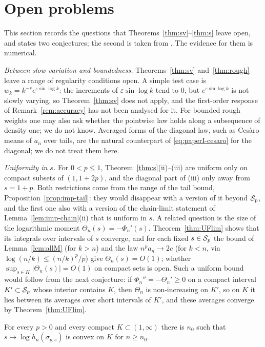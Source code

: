 \section{Open problems}\label{sec:open}

This section records the questions that Theorems~\ref{thm:sv}--\ref{thm:s} leave open, and states two conjectures;
the second is taken from \cite{PaperII}. The evidence for them is numerical.

\emph{Between slow variation and boundedness.} Theorems~\ref{thm:sv} and~\ref{thm:rough} leave a range of regularity
conditions open. A simple test case is $w_k=k^{-s}e^{\varepsilon\sin\log k}$: the increments of $\varepsilon\sin\log k$
tend to $0$, but $e^{\varepsilon\sin\log k}$ is not slowly varying, so Theorem~\ref{thm:sv} does not apply, and the
first-order response of Remark~\ref{rem:accuracy} has not been analysed for it. For bounded rough weights one may also
ask whether the pointwise law holds along a subsequence of density one; we do not know. Averaged forms of the diagonal
law, such as Ces\`aro means of $a_n$ over tails, are the natural counterpart of \eqref{eq:paperI-cesaro} for the
diagonal; we do not treat them here.

\emph{Uniformity in $s$.} For $0<p\le1$, Theorem~\ref{thm:s}(ii)--(iii) are uniform only on compact subsets of
$(1,1+2p)$, and the diagonal part of (iii) only away from $s=1+p$. Both restrictions come from the range of the tail
bound, Proposition~\ref{prop:imp-tail}: they would disappear with a version of it beyond $\mathcal{S}_p$, and the first one also
with a version of the chain-limit statement of Lemma~\ref{lem:imp-chain}(ii) that is uniform in $s$. A related question is the size of the logarithmic moment $\Theta_n(s)=-\Phi_n'(s)$.
Theorem~\ref{thm:UFlim} shows that its integrals over intervals of $s$ converge, and for each fixed $s\in\mathcal{S}_p$ the bound of
Lemma~\ref{lem:allM} (for $k>n$) and the law $n^pa_n\to2c$ (for $k<n$, via $\log(n/k)\le(n/k)^p/p$) give
$\Theta_n(s)=O(1)$; whether $\sup_{s\in K}|\Theta_n(s)|=O(1)$ on compact sets is open. Such a uniform bound
would follow from the next conjecture: if $\Phi_n''=-\Theta_n'\ge0$ on a compact interval $K'\subset\mathcal{S}_p$ whose interior
contains $K$, then $\Theta_n$ is non-increasing on $K'$, so on $K$ it lies between its averages over short intervals of
$K'$, and these averages converge by Theorem~\ref{thm:UFlim}.

\begin{conjecture}[convexity in $s$]\label{conj:convex}
For every $p>0$ and every compact $K\subset(1,\infty)$ there is $n_0$ such that $s\mapsto\log h_n(\sigma_{p,s})$ is
convex on $K$ for $n\ge n_0$.
\end{conjecture}

